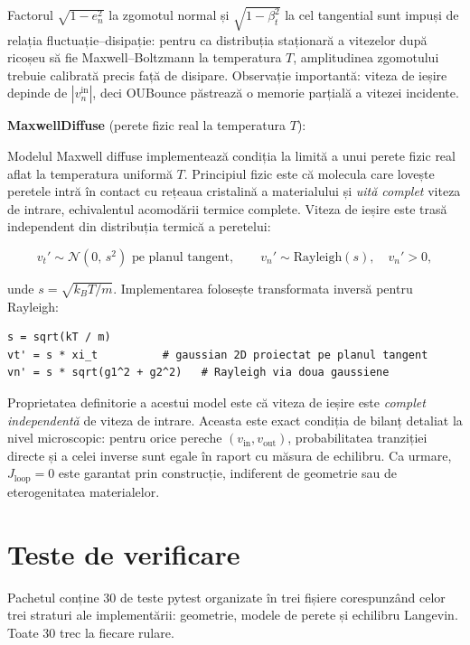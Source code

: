 \documentclass[12pt,openright,twoside]{book}
\begin{document}
Factorul $\sqrt{1 - e_n^2}$ la zgomotul normal și $\sqrt{1 - \beta_t^2}$ la cel tangential sunt impuși de relația fluctuație--disipație: pentru ca distribuția staționară a vitezelor după ricoșeu să fie Maxwell--Boltzmann la temperatura $T$, amplitudinea zgomotului trebuie calibrată precis față de disipare. Observație importantă: viteza de ieșire depinde de $|v_n^\text{in}|$, deci OUBounce păstrează o memorie parțială a vitezei incidente.

\textbf{MaxwellDiffuse} (perete fizic real la temperatura $T$):

Modelul Maxwell diffuse implementează condiția la limită a unui perete fizic real aflat la temperatura uniformă $T$. Principiul fizic este că molecula care lovește peretele intră în contact cu rețeaua cristalină a materialului și \emph{uită complet} viteza de intrare, echivalentul acomodării termice complete. Viteza de ieșire este trasă independent din distribuția termică a peretelui:

\begin{equation}
    v_t' \sim \mathcal{N}(0,\, s^2)\text{ pe planul tangent},
    \qquad
    v_n' \sim \text{Rayleigh}(s), \quad v_n' > 0,
    \label{eq:maxwell_diffuse}
\end{equation}

unde $s = \sqrt{k_BT/m}$. Implementarea folosește transformata inversă pentru Rayleigh:

\begin{verbatim}
s = sqrt(kT / m)
vt' = s * xi_t          # gaussian 2D proiectat pe planul tangent
vn' = s * sqrt(g1^2 + g2^2)   # Rayleigh via doua gaussiene
\end{verbatim}

Proprietatea definitorie a acestui model este că viteza de ieșire este \emph{complet independentă} de viteza de intrare. Aceasta este exact condiția de bilanț detaliat la nivel microscopic: pentru orice pereche $(v_\text{in}, v_\text{out})$, probabilitatea tranziției directe și a celei inverse sunt egale în raport cu măsura de echilibru. Ca urmare, $J_\text{loop} = 0$ este garantat prin construcție, indiferent de geometrie sau de eterogenitatea materialelor.

\section{Teste de verificare}

Pachetul conține 30 de teste pytest organizate în trei fișiere corespunzând celor trei straturi ale implementării: geometrie, modele de perete și echilibru Langevin. Toate 30 trec la fiecare rulare.
\end{document}
